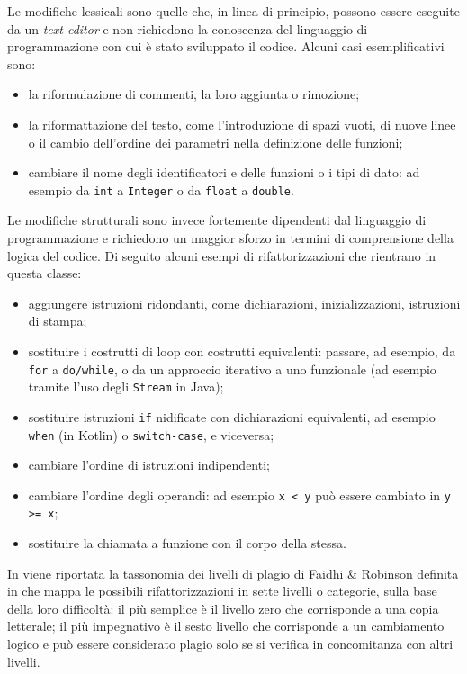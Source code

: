 Le modifiche lessicali sono quelle che, in linea di principio, possono essere eseguite da un \textit{text editor} e non richiedono la conoscenza del linguaggio di programmazione con cui è stato sviluppato il codice.
%
Alcuni casi esemplificativi sono:
\begin{itemize}
    \item la riformulazione di commenti, la loro aggiunta o rimozione;
    \item la riformattazione del testo, come l'introduzione di spazi vuoti, di nuove linee o il cambio dell'ordine dei parametri nella definizione delle funzioni;
    \item cambiare il nome degli identificatori e delle funzioni o i tipi di dato: ad esempio da \texttt{int} a \texttt{Integer} o da \texttt{float} a \texttt{double}.
\end{itemize}

Le modifiche strutturali sono invece fortemente dipendenti dal linguaggio di programmazione e richiedono un maggior sforzo in termini di comprensione della logica del codice.
%
Di seguito alcuni esempi di rifattorizzazioni che rientrano in questa classe:
\begin{itemize}
    \item aggiungere istruzioni ridondanti, come dichiarazioni, inizializzazioni, istruzioni di stampa;
    \item sostituire i costrutti di loop con costrutti equivalenti: passare, ad esempio, da \texttt{for} a \texttt{do/while}, o da un approccio iterativo a uno funzionale (ad esempio tramite l'uso degli \texttt{Stream} in Java);
    \item sostituire istruzioni \texttt{if} nidificate con dichiarazioni equivalenti, ad esempio \texttt{when} (in Kotlin) o \texttt{switch-case}, e viceversa;
    \item cambiare l'ordine di istruzioni indipendenti;
    \item cambiare l'ordine degli operandi: ad esempio \texttt{x < y} può essere cambiato in \texttt{y >= x};
    \item sostituire la chiamata a funzione con il corpo della stessa.
\end{itemize}

In  viene riportata la tassonomia dei livelli di plagio di Faidhi \& Robinson definita in \cite{faidhi-robinson-1987} che mappa le possibili rifattorizzazioni in sette livelli o categorie, sulla base della loro difficoltà: il più semplice è il livello zero che corrisponde a una copia letterale; il più impegnativo è il sesto livello che corrisponde a un cambiamento logico e può essere considerato plagio solo se si verifica in concomitanza con altri livelli.

